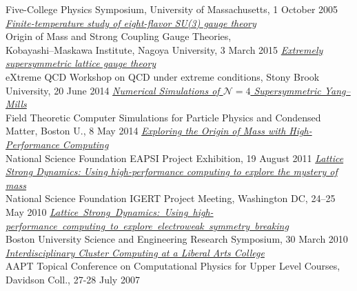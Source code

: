 \begin{spacelistout}
\begin{revnumerate}
      Five-College Physics Symposium, University of Massachusetts, 1 October 2005 \\
%
%
%
\vspace{18 pt} \hspace{-22 pt}{\large \bfseries Posters} \vspace{-8 pt}
    \pagebreakitem
      \textit{\href{http://www.davidschaich.net/talks/SCGTposter.pdf}{Finite-temperature study of eight-flavor SU(3) gauge theory}} \\
      Origin of Mass and Strong Coupling Gauge Theories, \\ Kobayashi--Maskawa Institute, Nagoya University, 3 March 2015
    \pagebreakitem
      \textit{\href{http://www.davidschaich.net/talks/XQCD14.pdf}{Extremely supersymmetric lattice gauge theory}} \\
      eXtreme QCD Workshop on QCD under extreme conditions, Stony Brook University, 20 June 2014
    \pagebreakitem
      \textit{\href{http://www.davidschaich.net/talks/PPCM14.pdf}{Numerical Simulations of $\mathcal N = 4$ Supersymmetric Yang--Mills}} \\
      Field Theoretic Computer Simulations for Particle Physics and Condensed Matter, Boston U., 8 May 2014
    \pagebreakitem
      \textit{\href{http://www.davidschaich.net/talks/SITposter.pdf}{Exploring the Origin of Mass with High-Performance Computing}} \\
      National Science Foundation EAPSI Project Exhibition, 19 August 2011
    \pagebreakitem
      \textit{\href{http://www.davidschaich.net/talks/IGERT.pdf}{Lattice Strong Dynamics: Using high-performance computing to explore the mystery of mass}} \\
      National Science Foundation IGERT Project Meeting, Washington DC, 24--25 May 2010
    \pagebreakitem
      \textit{\href{http://www.davidschaich.net/talks/BUsymposium.pdf}{Lattice~Strong~Dynamics:~Using~high-performance~computing~to~explore~electroweak~symmetry~breaking}} \\
      Boston University Science and Engineering Research Symposium, 30 March 2010
    \pagebreakitem
      \textit{\href{http://www.davidschaich.net/talks/AAPT07.pdf}{Interdisciplinary Cluster Computing at a Liberal Arts College}} \\
      AAPT Topical Conference on Computational Physics for Upper Level Courses, Davidson Coll., 27-28 July 2007
  \end{revnumerate}
\end{spacelistout}
